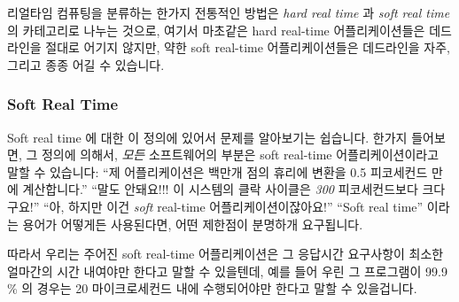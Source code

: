 리얼타임 컴퓨팅을 분류하는 한가지 전통적인 방법은 \emph{hard real time} 과
\emph{soft real time} 의 카테고리로 나누는 것으로, 여기서 마초같은 hard
real-time 어플리케이션들은 데드라인을 절대로 어기지 않지만, 약한 soft real-time
어플리케이션들은 데드라인을 자주, 그리고 종종 어길 수 있습니다.

\subsubsection{Soft Real Time}
\label{sec:Soft Real Time}

Soft real time 에 대한 이 정의에 있어서 문제를 알아보기는 쉽습니다.
한가지 들어보면, 그 정의에 의해서, \emph{모든} 소프트웨어의 부분은 soft
real-time 어플리케이션이라고 말할 수 있습니다:
``제 어플리케이션은 백만개 점의 휴리에 변환을 0.5 피코세컨드 만에 계산합니다.''
``말도 안돼요!!!
이 시스템의 클락 사이클은 \emph{300} 피코세컨드보다 크다구요!''
``아, 하지만 이건 \emph{soft} real-time 어플리케이션이잖아요!''
``Soft real time'' 이라는 용어가 어떻게든 사용된다면, 어떤 제한점이 분명하개
요구됩니다.

따라서 우리는 주어진 soft real-time 어플리케이션은 그 응답시간 요구사항이
최소한 얼마간의 시간 내여야만 한다고 말할 수 있을텐데, 예를 들어 우린 그
프로그램이 99.9\,\% 의 경우는 20 마이크로세컨드 내에 수행되어야만 한다고 말할 수
있을겁니다.

